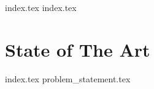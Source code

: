 {index.tex}
{index.tex}
\chapter{State of The Art}\label{cha:sota}
{index.tex}
{problem_statement.tex}
